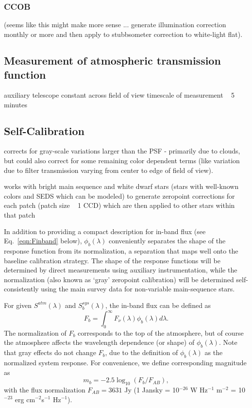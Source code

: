 \documentclass[12pt,preprint]{aastex}
\begin{document}
\subsubsection{CCOB}
(seems like this might make more sense ... generate illumination
correction monthly or more and then apply to stubbsometer correction
to white-light flat).



\subsection{Measurement of atmospheric transmission function}

auxiliary telescope
constant across field of view
timescale of measurement ~ 5 minutes


\subsection{Self-Calibration}
\label{selfcalib}

corrects for gray-scale variations larger than the PSF - primarily due to clouds,
but could also correct for some remaining color dependent terms (like variation
due to filter transmission varying from center to edge of field of view).

works with bright main sequence and white dwarf stars (stars with
well-known colors and SEDS which can be modeled) to generate zeropoint
corrections for each patch (patch size ~ 1 CCD) which are then applied
to other stars within that patch 

In addition to providing a compact description for in-band flux (see Eq.~\ref{eqn:Finband} 
below), $\phi_b(\lambda)$ conveniently separates the
shape of the response function from its normalization, a separation
that maps well onto the baseline calibration strategy.  The shape of 
the response functions will be determined by direct measurements
using auxiliary instrumentation, while the normalization (also known
as `gray' zeropoint calibration) will be determined self-consistently
using the main survey data for non-variable main-sequence stars. 

For given $S^{atm}(\lambda)$ and $S_b^{sys}(\lambda)$, the in-band flux can be 
defined as 
\begin{equation}
\label{eqn:Finband}
                          F_b = \int_0^\infty {F_\nu(\lambda) \phi_b(\lambda) d\lambda}.
\end{equation}
The normalization of $F_b$ corresponds to the top of the atmosphere,
but of course the atmosphere affects the wavelength dependence (or shape) of 
$\phi_b(\lambda)$. Note that gray effects do not change $F_b$, due to the 
definition of $\phi_b(\lambda)$ as the normalized system response.  For
convenience, we define corresponding magnitude as 
\begin{equation}
\label{eqn:maginband}
                    m_b = -2.5\log_{10}(F_b / F_{AB}),
\end{equation}
with the flux normalization $F_{AB} = 3631$ Jy (1 Jansky = 10$^{-26}$ W Hz$^{-1}$ m$^{-2}$ = 
10$^{-23}$ erg cm$^{-2}$s$^{-1}$ Hz$^{-1}$). 
\end{document}
